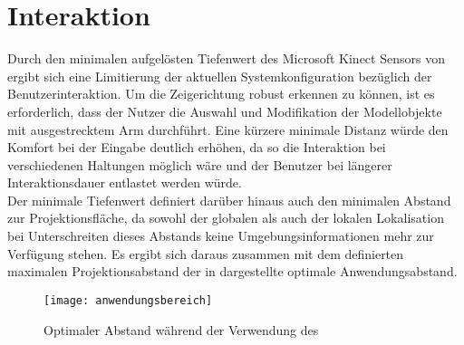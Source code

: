 \section{Interaktion}
Durch den minimalen aufgelösten Tiefenwert des Microsoft Kinect Sensors von \red[ABSTAND 0,8m?] ergibt sich eine Limitierung der aktuellen Systemkonfiguration bezüglich der Benutzerinteraktion. Um die Zeigerichtung robust erkennen zu können, ist es erforderlich, dass der Nutzer die Auswahl und Modifikation der Modellobjekte mit ausgestrecktem Arm durchführt. Eine kürzere minimale Distanz würde den Komfort bei der Eingabe deutlich erhöhen, da so die Interaktion bei verschiedenen Haltungen möglich wäre und der Benutzer bei längerer Interaktionsdauer entlastet werden würde.\\

Der minimale Tiefenwert definiert darüber hinaus auch den minimalen Abstand zur Projektionsfläche, da sowohl der globalen als auch der lokalen Lokalisation bei Unterschreiten dieses Abstands keine Umgebungsinformationen mehr zur Verfügung stehen. Es ergibt sich daraus zusammen mit dem definierten maximalen Projektionsabstand der in  dargestellte optimale Anwendungsabstand.\\

\begin{figure}[!ht]
	\begin{center}
		\texttt{[image: anwendungsbereich]}
		\caption{Optimaler Abstand während der Verwendung des }
		\label{fig.optdist}
	\end{center}
\end{figure}





